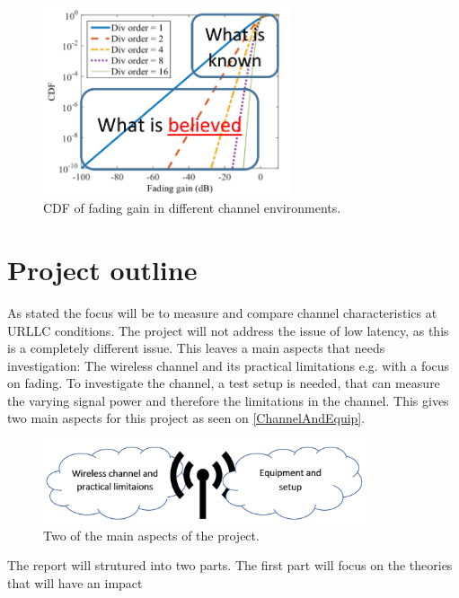 \begin{figure}[H]
\centering
\includegraphics[width=0.65\textwidth]{figures/fading_gain.png}
\caption{\Gls{CDF} of fading gain in different channel environments.}
\label{fading_gain}
\end{figure}


\section{Project outline}

As stated the focus will be to measure and compare channel characteristics at URLLC conditions. The project will not address the issue of low latency, as this is a completely different issue. This leaves a main aspects that needs investigation: The wireless channel and its practical limitations e.g. with a focus on fading. To investigate the channel, a test setup is needed, that can measure the varying signal power and therefore the limitations in the channel. This gives two main aspects for this project as seen on \autoref{ChannelAndEquip}.

\begin{figure}[H]
\centering
\includegraphics[width=0.85\textwidth]{figures/ProOutline.png}
\caption{Two of the main aspects of the project.}
\label{ChannelAndEquip}
\end{figure}

The report will strutured into two parts. The first part will focus on the theories that will have an impact




